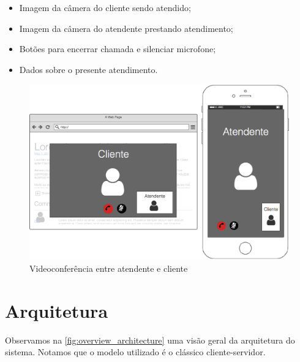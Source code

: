 \begin{itemize}
 \item Imagem da câmera do cliente sendo atendido;
 \item Imagem da câmera do atendente prestando atendimento;
 \item Botões para encerrar chamada e silenciar microfone;
 \item Dados sobre o presente atendimento.
\end{itemize}

\begin{figure}[ht!]
	\centering
    \includegraphics[scale=0.2]{figures/videoconference.png} 
	\caption{Videoconferência entre atendente e cliente}
	\label{fig:videoconference}
\end{figure}

\section{Arquitetura}

Observamos na \autoref{fig:overview_architecture} uma visão geral da arquitetura do sistema. Notamos que o modelo utilizado é o clássico cliente-servidor.


